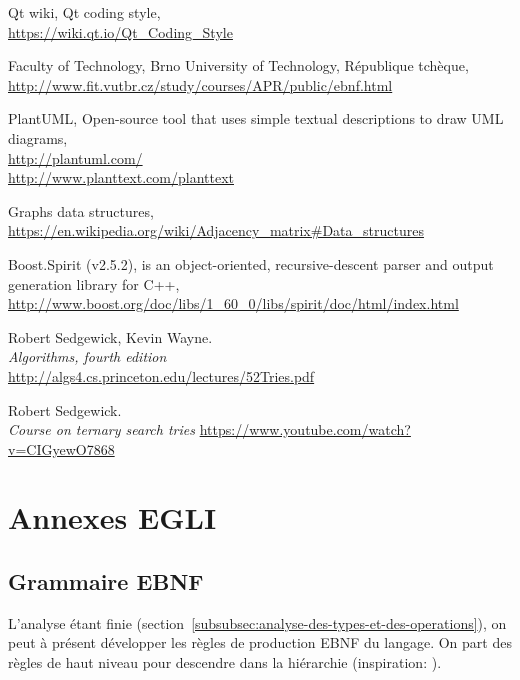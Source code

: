 \documentclass[french]{article}
\begin{document}
	\listoffigures
			
	\begin{thebibliography}{9}
		Qt wiki, Qt coding style,\\ \url{https://wiki.qt.io/Qt_Coding_Style}
		
		Faculty of Technology, Brno University of Technology, République tchèque,\\ \url{http://www.fit.vutbr.cz/study/courses/APR/public/ebnf.html}
		
		PlantUML, Open-source tool that uses simple textual descriptions to draw UML diagrams,\\ \url{http://plantuml.com/}\\ \url{http://www.planttext.com/planttext}
		
		Graphs data structures,\\ \url{https://en.wikipedia.org/wiki/Adjacency_matrix#Data_structures}
		
		Boost.Spirit (v2.5.2), is an object-oriented, recursive-descent parser and output generation library for C++,\\ \url{http://www.boost.org/doc/libs/1_60_0/libs/spirit/doc/html/index.html}
		
		Robert Sedgewick, Kevin Wayne.\\
		\emph{Algorithms, fourth edition}\\
		\url{http://algs4.cs.princeton.edu/lectures/52Tries.pdf}
		
		Robert Sedgewick.\\
		\emph{Course on ternary search tries}
		\url{https://www.youtube.com/watch?v=CIGyewO7868}
	\end{thebibliography}
			
	\newpage
	\section{Annexes EGLI}
	\label{sec:annexes-egli}
	
		\subsection{Grammaire EBNF} 
		L'analyse étant finie (section~\ref{subsubsec:analyse-des-types-et-des-operations}), on peut à présent développer les règles de production EBNF du langage. On part des règles de haut niveau pour descendre dans la hiérarchie (inspiration: \cite{vutbr.cz}).\\
		
\end{document}
